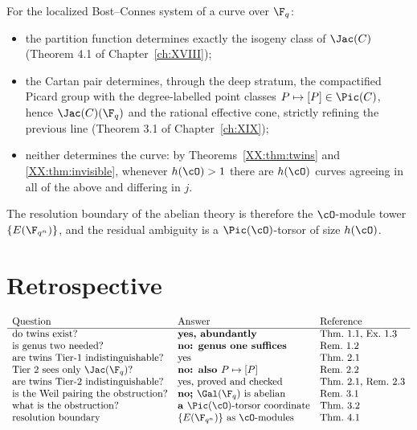 \begin{theorem}\label{XX:thm:master}
For the localized Bost--Connes system of a curve over $\F_q$:
\begin{itemize}
\item the partition function determines exactly the isogeny class of $\Jac(C)$
(Theorem 4.1 of Chapter~\ref{ch:XVIII});
\item the Cartan pair determines, through the deep stratum, the compactified Picard group
with the degree-labelled point classes $P\mapsto[P]\in\Pic(C)$,
hence $\Jac(C)(\F_q)$ and the rational effective cone, strictly refining the previous line
(Theorem 3.1 of Chapter~\ref{ch:XIX});
\item neither determines the curve: by Theorems~\ref{XX:thm:twins} and \ref{XX:thm:invisible},
whenever $h(\cO)>1$ there are $h(\cO)$ curves agreeing in all of the above and differing in
$j$.
\end{itemize}
The resolution boundary of the abelian theory is therefore the $\cO$-module tower
$\{E(\F_{q^n})\}$, and the residual ambiguity is a $\Pic(\cO)$-torsor of size $h(\cO)$.
\end{theorem}

\section{Retrospective}

\[
\begin{array}{lll}
\text{Question} & \text{Answer} & \text{Reference}\\\hline
\text{do twins exist?} & \textbf{yes, abundantly} & \text{Thm.~1.1, Ex.~1.3}\\
\text{is genus two needed?} & \textbf{no: genus one suffices} & \text{Rem.~1.2}\\
\text{are twins Tier-1 indistinguishable?} & \text{yes} & \text{Thm.~2.1}\\
\text{Tier 2 sees only }\Jac(\F_q)? & \textbf{no: also }P\mapsto[P] & \text{Rem.~2.2}\\
\text{are twins Tier-2 indistinguishable?} & \text{yes, proved and checked} & \text{Thm.~2.1, Rem.~2.3}\\
\text{is the Weil pairing the obstruction?} & \textbf{no; }\Gal(\F_q)\text{ is abelian} & \text{Rem.~3.1}\\
\text{what is the obstruction?} & \textbf{a }\Pic(\cO)\text{-torsor coordinate} & \text{Thm.~3.2}\\
\text{resolution boundary} & \{E(\F_{q^n})\}\ \text{as }\cO\text{-modules} & \text{Thm.~4.1}
\end{array}
\]


